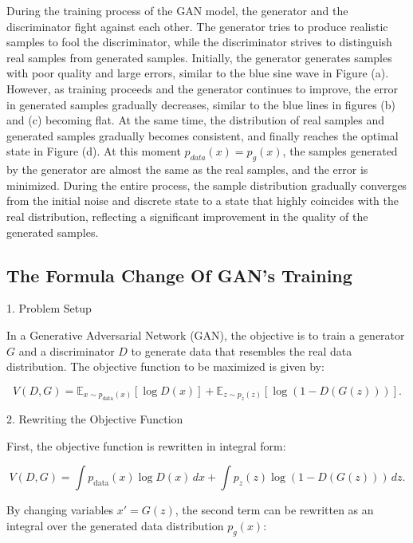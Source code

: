 During the training process of the GAN model, the generator and the discriminator fight against each other. 
The generator tries to produce realistic samples to fool the discriminator, while the discriminator strives 
to distinguish real samples from generated samples. Initially, the generator generates samples with poor 
quality and large errors, similar to the blue sine wave in Figure (a). However, as training proceeds and 
the generator continues to improve, the error in generated samples gradually decreases, similar to the 
blue lines in figures (b) and (c) becoming flat. At the same time, the distribution of real samples and 
generated samples gradually becomes consistent, and finally reaches the optimal state in Figure (d). At this moment $p_{data}(x) = p_g(x)$, 
the samples generated by the generator are almost the same as the real samples, and the error is minimized. 
During the entire process, the sample distribution gradually converges from the initial noise and discrete 
state to a state that highly coincides with the real distribution, reflecting a significant improvement in 
the quality of the generated samples.


\subsection{The Formula Change Of GAN's Training}


1. Problem Setup

In a Generative Adversarial Network (GAN), the objective is to train a generator \( G \) and a discriminator \( D \) to generate data that resembles the real data distribution. The objective function to be maximized is given by:

\begin{equation}
    V(D, G) = \mathbb{E}_{x \sim p_{\text{data}}(x)} [\log D(x)] + \mathbb{E}_{z \sim p_{z}(z)} [\log (1 - D(G(z)))].
\end{equation}

2. Rewriting the Objective Function

First, the objective function is rewritten in integral form:

\begin{equation}
    V(D, G) = \int p_{\text{data}}(x) \log D(x) \, dx + \int p_{z}(z) \log (1 - D(G(z))) \, dz.
\end{equation}

By changing variables \(x' = G(z)\), the second term can be rewritten as an integral over the generated data distribution \(p_g(x)\):

